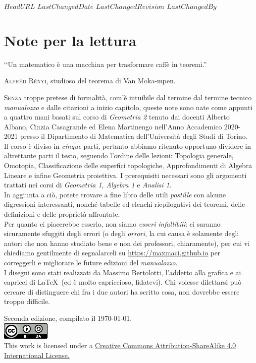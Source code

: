 \svnidlong
{$HeadURL$}
{$LastChangedDate$}
{$LastChangedRevision$}
{$LastChangedBy$}

\chapter*{Note per la lettura}

\begin{introduction}
‘‘Un matematico è una macchina per trasformare caffè in teoremi.''
\begin{flushright}
	\textsc{Alfréd Rényi,} studioso del teorema di Van Moka-mpen.
\end{flushright}
\end{introduction}

\lettrine[findent=1pt, nindent=0pt]{S}{enza} troppe pretese di formalità, com'è intuibile dal termine dal termine tecnico \textit{manualozzo} e dalle citazioni a inizio capitolo, queste note sono nate come appunti a quattro mani basati sul corso di \textit{Geometria 2} tenuto dai docenti Alberto Albano, Cinzia Casagrande ed Elena Martinengo nell'Anno Accademico 2020-2021 presso il Dipartimento di Matematica dell'Università degli Studi di Torino.\\
Il corso è diviso in \textit{cinque} parti, pertanto abbiamo ritenuto opportuno dividere in altrettante parti il testo, seguendo l'ordine delle lezioni: Topologia generale, Omotopia, Classificazione delle superfici topologiche, Approfondimenti di Algebra Lineare e infine Geometria proiettiva. I prerequisiti necessari sono gli argomenti trattati nei corsi di \textit{Geometria 1, Algebra 1} e \textit{Analisi 1}.\\
In aggiunta a ciò, potete trovare a fine libro delle utili \textit{postille} con alcune digressioni interessanti, nonché tabelle ed elenchi riepilogativi dei teoremi, delle definizioni e delle proprietà affrontate.\\
Per quanto ci piacerebbe esserlo, non siamo \textit{esseri infallibili}: ci saranno sicuramente sfuggiti degli errori (o degli \textit{orrori}, la cui causa è solamente degli autori che non hanno studiato bene e non dei professori, chiaramente), per cui vi chiediamo gentilmente di segnalarceli su \textcolor{redill}{\url{https://maxmaci.github.io}} per correggerli e migliorare le future edizioni del \textit{manualozzo}.\\
I disegni sono stati realizzati da Massimo Bertolotti, l'addetto alla grafica e ai capricci di \LaTeX\ (ed è molto capriccioso, fidatevi). Chi volesse dilettarsi può cercare di distinguere chi fra i due autori ha scritto cosa, non dovrebbe essere troppo difficile.
\vfill
\begin{center}
	Seconda edizione, compilato il \today.\\
			\includegraphics[trim=0cm 0cm 0cm 0cm,clip,scale=0.5]{images/88x31.png}\\
	{\footnotesize This work is licensed under a \href{https://creativecommons.org/licenses/by-sa/4.0/}{Creative Commons Attribution-ShareAlike 4.0 International License.}}
\end{center}